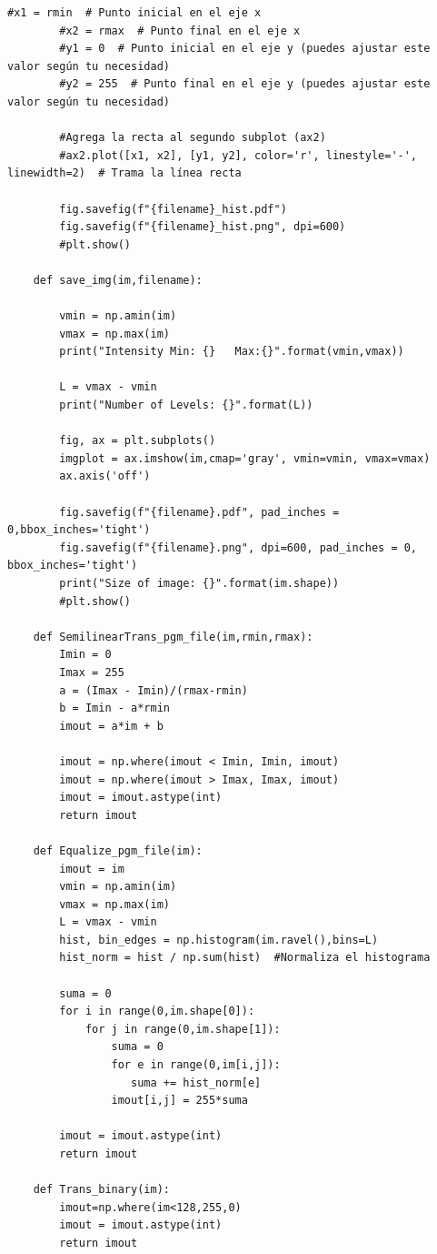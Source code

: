 \documentclass[11pt,twocolumn,twoside]{opticajnl}
\begin{document}
\begin{onecolumn}
\begin{lstlisting}[style=mystyle]
        #x1 = rmin  # Punto inicial en el eje x
        #x2 = rmax  # Punto final en el eje x
        #y1 = 0  # Punto inicial en el eje y (puedes ajustar este valor según tu necesidad)
        #y2 = 255  # Punto final en el eje y (puedes ajustar este valor según tu necesidad)
    
        #Agrega la recta al segundo subplot (ax2)
        #ax2.plot([x1, x2], [y1, y2], color='r', linestyle='-', linewidth=2)  # Trama la línea recta
    
        fig.savefig(f"{filename}_hist.pdf")
        fig.savefig(f"{filename}_hist.png", dpi=600)
        #plt.show()
    
    def save_img(im,filename):
        
        vmin = np.amin(im)
        vmax = np.max(im)
        print("Intensity Min: {}   Max:{}".format(vmin,vmax))
    
        L = vmax - vmin
        print("Number of Levels: {}".format(L))
    
        fig, ax = plt.subplots()
        imgplot = ax.imshow(im,cmap='gray', vmin=vmin, vmax=vmax)
        ax.axis('off')
    
        fig.savefig(f"{filename}.pdf", pad_inches = 0,bbox_inches='tight')
        fig.savefig(f"{filename}.png", dpi=600, pad_inches = 0, bbox_inches='tight')
        print("Size of image: {}".format(im.shape))
        #plt.show()
    
    def SemilinearTrans_pgm_file(im,rmin,rmax):
        Imin = 0
        Imax = 255
        a = (Imax - Imin)/(rmax-rmin)
        b = Imin - a*rmin  
        imout = a*im + b
    
        imout = np.where(imout < Imin, Imin, imout)
        imout = np.where(imout > Imax, Imax, imout)
        imout = imout.astype(int)
        return imout
    
    def Equalize_pgm_file(im):
        imout = im 
        vmin = np.amin(im)
        vmax = np.max(im)
        L = vmax - vmin
        hist, bin_edges = np.histogram(im.ravel(),bins=L)
        hist_norm = hist / np.sum(hist)  #Normaliza el histograma
    
        suma = 0
        for i in range(0,im.shape[0]):
            for j in range(0,im.shape[1]):
                suma = 0
                for e in range(0,im[i,j]):
                   suma += hist_norm[e]
                imout[i,j] = 255*suma
    
        imout = imout.astype(int)
        return imout
    
    def Trans_binary(im):
        imout=np.where(im<128,255,0)
        imout = imout.astype(int)
        return imout
    

\end{lstlisting}
\end{onecolumn}
\end{document}
